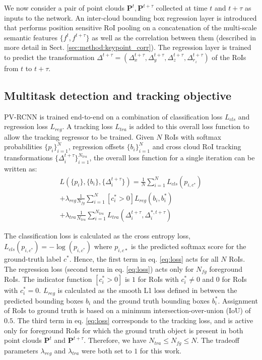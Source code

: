 \documentclass[10pt,twocolumn,letterpaper]{article}
\begin{document}
We now consider a pair of point clouds $\mathbf{P}^t, \mathbf{P}^{t+\tau}$ collected at time $t$ and $t+\tau$ as inputs to the network. An inter-cloud bounding box regression layer is introduced that performs position sensitive RoI pooling on a concatenation of the multi-scale semantic features $\{f^t, f^{t+\tau}\}$ as well as the correlation between them (described in more detail in Sect. \ref{sec:method:keypoint_corr}). The regression layer is trained to predict the transformation $\Delta^{t+\tau} = (\Delta_{x}^{t+\tau}, \Delta_{y}^{t+\tau}, \Delta_{z}^{t+\tau}, \Delta_{r_z}^{t+\tau})$ of the RoIs from $t$ to $t+\tau$.

\subsection{Multitask detection and tracking objective}\label{sec:method:multi_loss}
PV-RCNN \cite{Shi_2020_CVPR} is trained end-to-end on a combination of classification loss $L_{cls}$ and regression loss $L_{reg}$. A tracking loss $L_{tra}$ is added to this overall loss function to allow the tracking regressor to be trained. Given $N$ RoIs with softmax probabilities $\{p_i\}_{i=1}^N$, regression offsets $\{b_i\}_{i=1}^N$ and cross cloud RoI tracking transformations $\{\Delta_i^{t+\tau}\}_{i=1}^{N_{tra}}$, the overall loss function for a single iteration can be written as:
\begin{align}
   \label{eq:loss}
   L(\{p_i\}, \{b_i\}, \{\Delta_i^{t+\tau}\}) = \frac{1}{N}\sum_{i=1}^{N}L_{cls}(p_{i,c^*})\nonumber\\
   +\lambda_{reg}\frac{1}{N_{fg}}\sum_{i=1}^{N} [c_i^*>0]L_{reg}(b_i, b_i^*)\\
   + \lambda_{tra}\frac{1}{N_{tra}}\sum_{i=1}^{N_{tra}}L_{tra}(\Delta_i^{t+\tau}, \Delta_i^{*, t+\tau})\nonumber
\end{align}

The classification loss is calculated as the cross entropy loss, $L_{cls}(p_{i,c^*}) = -\log{(p_{i,c^*})}$ where $p_{i,c*}$ is the predicted softmax score for the ground-truth label $c^*$. Hence, the first term in eq. \ref{eq:loss} acts for all $N$ RoIs. The regression loss (second term in eq. \ref{eq:loss}) acts only for $N_{fg}$ foreground RoIs. The indicator function $[c_i^*>0]$ is $1$ for RoIs with $c_i^*\neq 0$ and $0$ for RoIs with $c_i^*=0$. $L_{reg}$ is calculated as the smooth L1 loss defined in \cite{Girshick2015} between the predicted bounding boxes $b_i$ and the ground truth bounding boxes $b_i^*$. Assignment of RoIs to ground truth is based on a minimum intersection-over-union (IoU) of $0.5$. The third term in eq. \ref{eq:loss} corresponds to the tracking loss, and is active only for foreground RoIs for which the ground truth object is present in both point clouds $\mathbf{P}^t$ and $\mathbf{P}^{t+\tau}$. Therefore, we have $N_{tra}\leq N_{fg}\leq N$. The tradeoff parameters $\lambda_{reg}$ and $\lambda_{tra}$ were both set to $1$ for this work.
\end{document}
